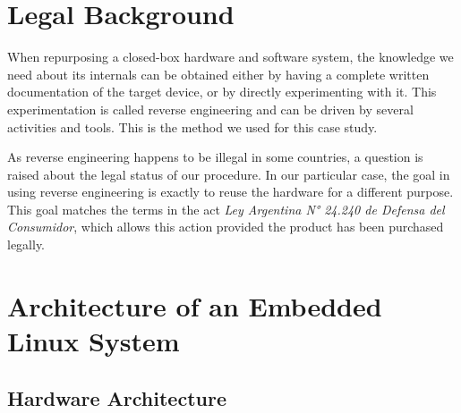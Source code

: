\documentclass[conference]{IEEEtran}
\newcommand{\nota}[1]{}
\begin{document}
\section{Legal Background}

\nota{ Marco Jurídico }

\nota{Cuando reutilizamos un sistema embebido de hardware y software cerrado, necesitamos la
documentación completa de las especificaciones del dispositivo.
Si esa documentación no existe, o si no existe
completamente, es necesario descubrir su funcionamiento mediante
diferentes pruebas. Este último método es el elegido en este artículo, y es lo que 
se denomina ingeniería inversa.}

When repurposing a closed-box hardware and software system, the knowledge we need about its internals can be obtained either by having a complete written documentation of the target device, or by directly experimenting with it. This experimentation is called reverse engineering and can be driven by several activities and tools. This is the method we used for this case study.

\nota{Esto plantea la inquietud acerca de la legalidad 
del proceso, debido a las posibles restricciones en las licencias de uso de cada producto
específico. En este caso en particular, sólo se usa ingeniería inversa para poder
reutilizar el hardware con un propósito diferente, lo cual es acorde con las Ley
Argentina N° 24.240 de Defensa del Consumidor (referencia :),
http://www.infoleg.gov.ar/infolegInternet/anexos/0-4999/638/texact.htm),
siempre que el producto haya sido adquirido legalmente.}

As reverse engineering happens to be illegal in some countries, a question is raised 
about the legal status of our procedure. In our particular case, the goal in using 
reverse engineering is exactly to reuse the hardware for a different purpose. This goal
matches the terms in the act \emph{Ley Argentina N° 24.240 de Defensa del Consumidor}, which allows this action provided the product has been purchased legally.



\section{Architecture of an Embedded Linux System}
\subsection{Hardware Architecture}
\end{document}
